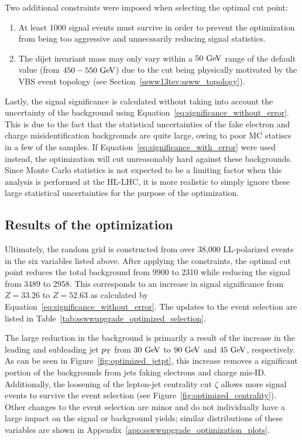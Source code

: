 Two additional constraints were imposed when selecting the optimal cut point:
\begin{enumerate}
\item At least 1000 signal events must survive in order to prevent the optimization from being too aggressive and unnecssarily reducing signal statistics.
\item The dijet invariant mass may only vary within a $50\gev$ range of the default value (from $450-550\gev$) due to the cut being physically motivated by the VBS event topology (see Section~\ref{ssww13tev:ssww_topology}).
\end{enumerate}

Lastly, the signal significance is calculated without taking into account the uncertainty of the background using Equation~\ref{eq:significance_without_error}.
This is due to the fact that the statistical uncertainties of the fake electron and charge misidentification backgrounds are quite large, owing to poor MC statiscs in a few of the samples.
If Equation~\ref{eq:significance_with_error} were used instead, the optimization will cut unreasonably hard against these backgrounds.
Since Monte Carlo statistics is not expected to be a limiting factor when this analysis is performed at the HL-LHC, it is more realistic to simply ignore these large statistical uncertainties for the purpose of the optimization.

%
\subsection{Results of the optimization}\label{sswwupgrade:opt_results}
Ultimately, the random grid is constructed from over 38,000 LL-polarized \ssww events in the six variables listed above.
After applying the constraints, the optimal cut point reduces the total background from 9900 to 2310 while reducing the signal from 3489 to 2958.
This corresponds to an increase in signal significance from $Z = 33.26$ to $Z = 52.63$ as calculated by Equation~\ref{eq:significance_without_error}.
The updates to the event selection are listed in Table~\ref{tab:sswwupgrade_optimized_selection}. %

The large reduction in the background is primarily a result of the increase in the leading and subleading jet $p_{\mathrm{T}}$ from $30\gev$ to $90\gev$ and $45\gev$, respectively.
As can be seen in Figure~\ref{fig:optimized_jetpt}, this increase removes a significant portion of the backgrounds from jets faking electrons and charge mis-ID.
Additionally, the loosening of the lepton-jet centrality cut $\zeta$ allows more signal events to survive the event selection (see Figure~\ref{fig:optimized_centrality}).
Other changes to the event selection are minor and do not individually have a large impact on the signal or background yields; similar distributions of these variables are shown in Appendix~\ref{app:sswwupgrade_optimization_plots}.

